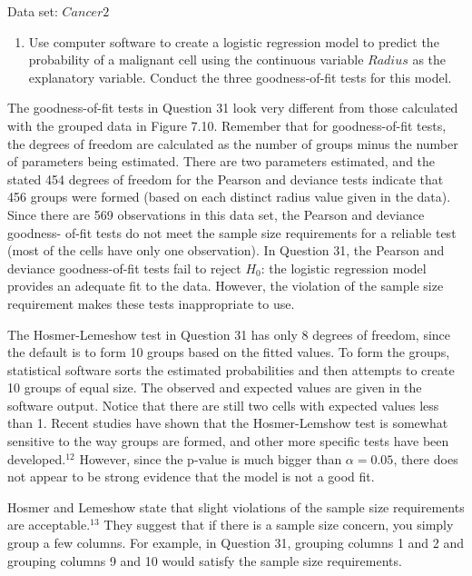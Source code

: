 \documentclass[
]{report}
\providecommand{\tightlist}{%
  \setlength{\itemsep}{0pt}\setlength{\parskip}{0pt}}
\begin{document}
Data set: \(Cancer2\)

\begin{enumerate}
\def\labelenumi{\arabic{enumi}.}
\setcounter{enumi}{30}
\tightlist
\item
  Use computer software to create a logistic regression model to predict the probability of a malignant cell using the continuous variable \(Radius\) as the explanatory variable. Conduct the three goodness‐of‐fit tests for this model.
\end{enumerate}

The goodness-of-fit tests in Question 31 look very different from those calculated with the grouped data
in Figure 7.10. Remember that for goodness-of-fit tests, the degrees of freedom are calculated as the number of
groups minus the number of parameters being estimated. There are two parameters estimated, and the stated 454
degrees of freedom for the Pearson and deviance tests indicate that 456 groups were formed (based on each distinct
radius value given in the data). Since there are 569 observations in this data set, the Pearson and deviance goodness-
of-fit tests do not meet the sample size requirements for a reliable test (most of the cells have only one observation).
In Question 31, the Pearson and deviance goodness-of-fit tests fail to reject \(H_0\): the logistic regression
model provides an adequate fit to the data. However, the violation of the sample size requirement makes these
tests inappropriate to use.

The Hosmer-Lemeshow test in Question 31 has only 8 degrees of freedom, since the default is to form 10
groups based on the fitted values. To form the groups, statistical software sorts the estimated probabilities and
then attempts to create 10 groups of equal size. The observed and expected values are given in the software
output. Notice that there are still two cells with expected values less than 1. Recent studies have shown that
the Hosmer-Lemshow test is somewhat sensitive to the way groups are formed, and other more specific tests
have been developed.\(^12\) However, since the p-value is much bigger than \(\alpha = 0.05\), there does not appear to
be strong evidence that the model is not a good fit.

Hosmer and Lemeshow state that slight violations of the sample size requirements are acceptable.\(^13\) They
suggest that if there is a sample size concern, you simply group a few columns. For example, in Question
31, grouping columns 1 and 2 and grouping columns 9 and 10 would satisfy the sample size requirements.
\end{document}
